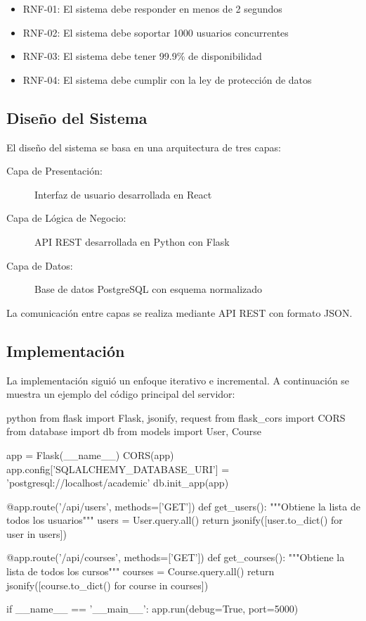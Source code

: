 \documentclass{pt-report}
\begin{document}
\begin{itemize}
    \item RNF-01: El sistema debe responder en menos de 2 segundos
    \item RNF-02: El sistema debe soportar 1000 usuarios concurrentes
    \item RNF-03: El sistema debe tener 99.9\% de disponibilidad
    \item RNF-04: El sistema debe cumplir con la ley de protección de datos
\end{itemize}

\subsection{Diseño del Sistema}

El diseño del sistema se basa en una arquitectura de tres capas:

\begin{description}
    \item[Capa de Presentación:] Interfaz de usuario desarrollada en React
    \item[Capa de Lógica de Negocio:] API REST desarrollada en Python con Flask
    \item[Capa de Datos:] Base de datos PostgreSQL con esquema normalizado
\end{description}

La comunicación entre capas se realiza mediante API REST con formato JSON.

\subsection{Implementación}

La implementación siguió un enfoque iterativo e incremental. A continuación
se muestra un ejemplo del código principal del servidor:

\begin{ptprintcode}{python}
    from flask import Flask, jsonify, request
    from flask_cors import CORS
    from database import db
    from models import User, Course

    app = Flask(__name__)
    CORS(app)
    app.config['SQLALCHEMY_DATABASE_URI'] = 'postgresql://localhost/academic'
    db.init_app(app)

    @app.route('/api/users', methods=['GET'])
    def get_users():
    """Obtiene la lista de todos los usuarios"""
    users = User.query.all()
    return jsonify([user.to_dict() for user in users])

    @app.route('/api/courses', methods=['GET'])
    def get_courses():
    """Obtiene la lista de todos los cursos"""
    courses = Course.query.all()
    return jsonify([course.to_dict() for course in courses])

    if __name__ == '__main__':
    app.run(debug=True, port=5000)
\end{ptprintcode}
\end{document}
